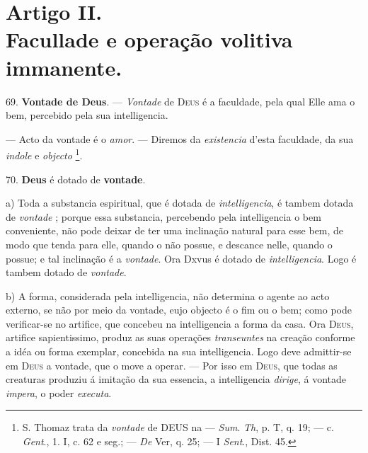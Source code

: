 
\section*{Artigo II.\\ Facullade e operação volitiva immanente.}

 69. \textbf{Vontade de Deus}. --- \emph{Vontade} de \textsc{Deus} é a faculdade, pela qual Elle ama o bem, percebido pela sua intelligencia.

 --- Acto da vontade é o \emph{amor}. --- Diremos da \emph{existencia} d'esta faculdade, da sua \emph{indole} e \emph{objecto} \footnote{S. Thomaz trata da \emph{vontade} de \textsc{DEUS} na --- \emph{Sum}. \emph{Th}, p. T, q. 19; --- c. \emph{Gent}., 1. I, c. 62 e seg.; --- \emph{De} Ver, q. 25; --- I \emph{Sent}., Dist. 45.}.

70. \textbf{Deus} é dotado de \textbf{vontade}.

a) Toda a substancia espiritual, que é dotada de \emph{intelligencia}, é tambem dotada de \emph{vontade} ; porque essa substancia, percebendo pela intelligencia o bem conveniente, não pode deixar de ter uma inclinação natural para esse bem, de modo que tenda para elle, quando o não possue, e descance nelle, quando o possue; e tal inclinação é a \emph{vontade}. Ora Dxvus é dotado de \emph{intelligencia}. Logo é tambem dotado de \emph{vontade}.

b) A forma, considerada pela intelligencia, não determina o agente ao acto externo, se não por meio da vontade, eujo objecto é o fim ou o bem; como pode verificar-se no artifice, que concebeu na intelligencia a forma da casa. Ora \textsc{Deus}, artifice sapientissimo, produz as suas operações \emph{transeuntes} na creação conforme a idéa ou forma exemplar, concebida na sua intelligencia. Logo deve admittir-se em \textsc{Deus} a vontade, que o move a operar. --- Por isso em \textsc{Deus}, que todas as creaturas produziu á imitação da sua essencia, a intelligencia \emph{dirige}, á vontade \emph{impera}, o poder \emph{executa}.

